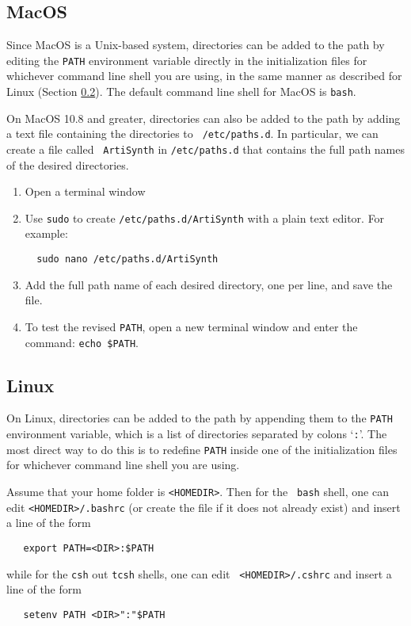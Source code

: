 \documentclass{article}
\begin{document}
\subsection{MacOS}

Since MacOS is a Unix-based system, directories can be added to the
path by editing the {\tt PATH} environment variable directly in the
initialization files for whichever command line shell you are using,
in the same manner as described for Linux (Section \ref{Linux}).
The default command line shell for MacOS is {\tt bash}.

On MacOS 10.8 and greater, directories can also be added to the
path by adding a text file containing the directories to {\tt
/etc/paths.d}.  In particular, we can create a file called {\tt
ArtiSynth} in {\tt /etc/paths.d} that contains the full path names of
the desired directories.

\begin{enumerate}

\item Open a terminal window

\item Use {\tt sudo} to create {\tt /etc/paths.d/ArtiSynth} with a plain
text editor. For example:
\begin{verbatim}
  sudo nano /etc/paths.d/ArtiSynth
\end{verbatim}

\item Add the full path name of each desired directory, one per line,
and save the file.

\item To test the revised {\tt PATH}, open a new terminal
window and enter the command: {\tt echo \$PATH}.

\end{enumerate}

\subsection{Linux}
\label{Linux}

On Linux, directories can be added to the path by appending them to
the {\tt PATH} environment variable, which is a list of directories
separated by colons `{\tt :}'. The most direct way to do this is to
redefine {\tt PATH} inside one of the initialization files for
whichever command line shell you are using.

Assume that your home folder is {\tt <HOMEDIR>}. Then for the {\tt
bash} shell, one can edit {\tt <HOMEDIR>/.bashrc} (or create the file
if it does not already exist) and insert a line of the form
\begin{verbatim}
   export PATH=<DIR>:$PATH
\end{verbatim}
while for the {\tt csh} out {\tt tcsh} shells, one can edit {\tt
<HOMEDIR>/.cshrc} and insert a line of the form
\begin{verbatim}
   setenv PATH <DIR>":"$PATH
\end{verbatim}
\end{document}
